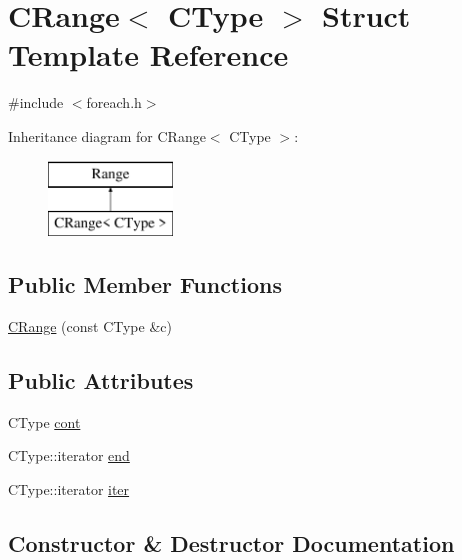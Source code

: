 \hypertarget{struct__fe_1_1CRange}{}\section{C\+Range$<$ C\+Type $>$ Struct Template Reference}
\label{struct__fe_1_1CRange}


{\ttfamily \#include $<$foreach.\+h$>$}

Inheritance diagram for C\+Range$<$ C\+Type $>$\+:\begin{figure}[H]
\begin{center}
\leavevmode
\includegraphics[height=2.000000cm]{struct__fe_1_1CRange}
\end{center}
\end{figure}
\subsection*{Public Member Functions}
\begin{DoxyCompactItemize}
\item 
\mbox{\hyperlink{struct__fe_1_1CRange_a67ad33211b9c44c83d4ba3d0989b37f9}{C\+Range}} (const C\+Type \&c)
\end{DoxyCompactItemize}
\subsection*{Public Attributes}
\begin{DoxyCompactItemize}
\item 
C\+Type \mbox{\hyperlink{struct__fe_1_1CRange_af5d7c61781b48d1b6b5fb41e51935df5}{cont}}
\item 
C\+Type\+::iterator \mbox{\hyperlink{struct__fe_1_1CRange_a0395b0c4aa512ba473e7fb95628ad9e9}{end}}
\item 
C\+Type\+::iterator \mbox{\hyperlink{struct__fe_1_1CRange_a4b3dac39a15fa51ba325f21072bdb873}{iter}}
\end{DoxyCompactItemize}


\subsection{Constructor \& Destructor Documentation}
\mbox{\label{struct__fe_1_1CRange_a67ad33211b9c44c83d4ba3d0989b37f9}} 
